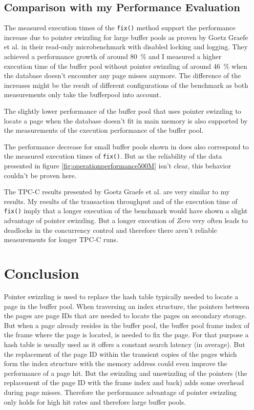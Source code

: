 \subsection{Comparison with my Performance Evaluation}

	The measured execution times of the \lstinline{fix()} method support the performance increase due to pointer swizzling for large buffer pools as proven by Goetz Graefe et al. in their read-only microbenchmark with disabled locking and logging. They achieved a performance growth of around \SI{80}{\percent} and I measured a higher execution time of the buffer pool without pointer swizzling of around \SI{46}{\percent} when the database doesn't encounter any page misses anymore. The difference of the increases might be the result of different configurations of the benchmark as both measurements only take the bufferpool into account.
	
	The slightly lower performance of the buffer pool that uses pointer swizzling to locate a page when the database doesn't fit in main memory is also supported by the measurements of the execution performance of the buffer pool.
	
	The performance decrease for small buffer pools shown in \cite{Graefe:2014} does also correspond to the measured execution times of \lstinline{fix()}. But as the reliability of the data presented in figure \ref{fig:operationperformance500M} isn't clear, this behavior couldn't be proven here.
	
	The TPC-C results presented by Goetz Graefe et al. are very similar to my results. My results of the transaction throughput and of the execution time of \lstinline{fix()} imply that a longer execution of the benchmark would have shown a slight advantage of pointer swizzling. But a longer execution of \emph{Zero} very often leads to deadlocks in the concurrency control and therefore there aren't reliable measurements for longer TPC-C runs.

\section{Conclusion}

	Pointer swizzling is used to replace the hash table typically needed to locate a page in the buffer pool. When traversing an index structure, the pointers between the pages are page IDs that are needed to locate the pages on secondary storage. But when a page already resides in the buffer pool, the buffer pool frame index of the frame where the page is located, is needed to fix the page. For that purpose a hash table is usually used as it offers a constant search latency (in average). But the replacement of the page ID within the transient copies of the pages which form the index structure with the memory address could even improve the performance of a page hit. But the swizzling and unswizzling of the pointers (the replacement of the page ID with the frame index and back) adds some overhead during page misses. Therefore the performance advantage of pointer swizzling only holds for high hit rates and therefore large buffer pools.

